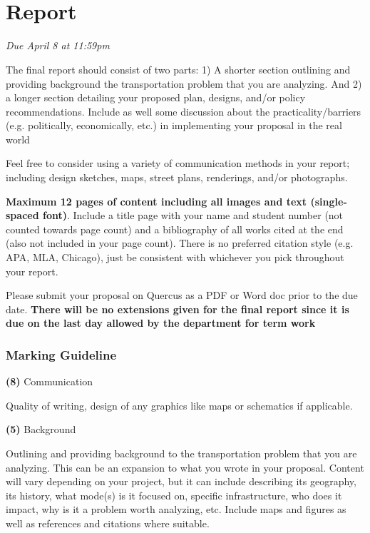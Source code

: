 \documentclass[11pt]{article}
\begin{document}
	
	
	
	
	\newpage
	
	
	\section*{\\Report}
	
	\textit{Due April 8 at 11:59pm}
	
	The final report should consist of two parts: 1) A shorter section outlining and providing background the transportation problem that you are analyzing. And 2) a longer section detailing your proposed plan, designs, and/or policy recommendations. Include as well some discussion about the practicality/barriers (e.g. politically, economically, etc.) in implementing your proposal in the real world
	
	Feel free to consider using a variety of communication methods in your report; including design sketches, maps, street plans, renderings, and/or photographs.
	
	\textbf{Maximum 12 pages of content including all images and text (single-spaced font)}. Include a title page with your name and student number (not counted towards page count) and a bibliography of all works cited at the end (also not included in your page count). There is no preferred citation style (e.g. APA, MLA, Chicago), just be consistent with whichever you pick throughout your report. 
	
	Please submit your proposal on Quercus as a PDF or Word doc prior to the due date. \textbf{There will be no extensions given for the final report since it is due on the last day allowed by the department for term work}
	
	
	
	
	
	

	\subsubsection*{Marking Guideline}
	
	\textbf{(8)} Communication 
	
	Quality of writing, design of any graphics like maps or schematics if applicable.
	
	\textbf{(5)} Background 
	
	Outlining and providing background to the transportation problem that you are analyzing. This can be an expansion to what you wrote in your proposal. Content will vary depending on your project, but it can include describing its geography, its history, what mode(s) is it focused on, specific infrastructure, who does it impact, why is it a problem worth analyzing, etc. Include maps and figures as well as references and citations where suitable.
	
\end{document}
